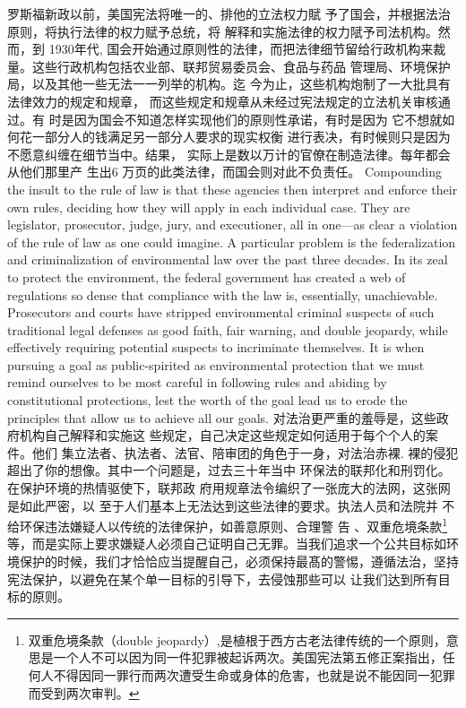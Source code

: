 \begin{paracol}{2}
罗斯福新政以前，美国宪法将唯一的、排他的立法权力賦
予了国会，并根据法治原则，将执行法律的权力赋予总统，将
解释和实施法律的权力陚予司法机构。然而，到 1930年代,
国会开始通过原则性的法律，而把法律细节留给行政机构来裁量。这些行政机构包括农业部、联邦贸易委员会、食品与药品
管理局、环境保护局，以及其他一些无法一一列举的机构。迄
今为止，这些机构炮制了一大批具有法律效力的规定和规章，
而这些规定和规章从未经过宪法规定的立法机关审核通过。有
时是因为国会不知道怎样实现他们的原则性承诺，有时是因为
它不想就如何花一部分人的钱满足另一部分人要求的现实权衡
进行表决，有时候则只是因为不愿意纠缠在细节当中。结果，
实际上是数以万计的官僚在制造法律。每年都会从他们那里产
生出6 万页的此类法律，而国会则对此不负责任。
\switchcolumn*
Compounding the insult to the rule of law is that these agencies then interpret and enforce their own rules, deciding how
they will apply in each individual case. They are legislator, prosecutor, judge, jury, and executioner, all in one---as clear a violation of the rule of law as one could imagine. A particular
problem is the federalization and criminalization of environmental law over the past three decades. In its zeal to protect the
environment, the federal government has created a web of regulations so dense that compliance with the law is, essentially,
unachievable. Prosecutors and courts have stripped environmental criminal suspects of such traditional legal defenses as
good faith, fair warning, and double jeopardy, while effectively
requiring potential suspects to incriminate themselves. It is
when pursuing a goal as public-spirited as environmental protection that we must remind ourselves to be most careful in following rules and abiding by constitutional protections, lest the
worth of the goal lead us to erode the principles that allow us to
achieve all our goals.
\switchcolumn
对法治更严重的羞辱是，这些政府机构自己解释和实施这
些规定，自己决定这些规定如何适用于每个个人的案件。他们
集立法者、执法者、法官、陪审团的角色于一身，对法治赤裸.
裸的侵犯超出了你的想像。其中一个问题是，过去三十年当中
环保法的联邦化和刑罚化。在保护环境的热情驱使下，联邦政
府用规章法令编织了一张庞大的法网，这张网是如此严密，以
至于人们基本上无法达到这些法律的要求。执法人员和法院并
不给环保违法嫌疑人以传统的法律保护，如善意原则、合理警
告 、双重危境条款\footnote{双重危境条款（double  jeopardy）,是植根于西方古老法律传统的一个原则，意思是一个人不可以因为同一件犯罪被起诉两次。美国宪法第五修正案指出，任何人不得因同一罪行而两次遭受生命或身体的危害，也就是说不能因同一犯罪而受到两次审判。}等，而是实际上要求嫌疑人必须自己证明自己无罪。当我们追求一个公共目标如环境保护的时候，我们才恰恰应当提醒自己，必须保持最髙的警惕，遵循法治，坚持宪法保护，以避免在某个单一目标的引导下，去侵蚀那些可以
让我们达到所有目标的原则。


\end{paracol}
